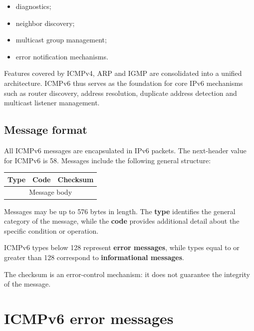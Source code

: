 \begin{itemize}
\item diagnostics;
\item neighbor discovery;
\item multicast group management;
\item error notification mechanisms.
\end{itemize}

Features covered by ICMPv4, ARP and IGMP are consolidated into a unified architecture. ICMPv6 thus serves as the foundation for core IPv6 mechanisms such as router discovery, address resolution, duplicate address detection and multicast listener management.

\subsection{Message format}

All ICMPv6 messages are encapsulated in IPv6 packets. The next-header value for ICMPv6 is 58. Messages include the following general structure:

\begin{center}
\begin{tabular}{|c|c|c|}
\hline
\textbf{Type} & \textbf{Code} & \textbf{Checksum}\\
\hline
\multicolumn{3}{|c|}{Message body}\\
\hline
\end{tabular}
\end{center}

Messages may be up to 576 bytes in length. The \textbf{type} identifies the general category of the message, while the \textbf{code} provides additional detail about the specific condition or operation.

ICMPv6 types below 128 represent \textbf{error messages}, while types equal to or greater than 128 correspond to \textbf{informational messages}.

The checksum is an error-control mechanism: it does not guarantee the integrity
of the message.

\begin{center}
\end{center}

\section{ICMPv6 error messages}

